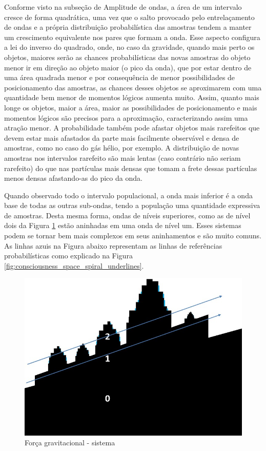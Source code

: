 Conforme visto na subseção de Amplitude de ondas, a área de um intervalo cresce de forma quadrática, uma vez que o salto provocado pelo entrelaçamento de ondas e a própria distribuição probabilística das amostras tendem a manter um crescimento equivalente nos pares que formam a onda. Esse aspecto configura a lei do inverso do quadrado, onde, no caso da gravidade, quando mais perto os objetos, maiores serão as chances probabilísticas das novas amostras do objeto menor ir em direção ao objeto maior (o pico da onda), que por estar dentro de uma área quadrada menor e por consequência de menor possibilidades de posicionamento das amostras, as chances desses objetos se aproximarem com uma quantidade bem menor de momentos lógicos aumenta muito. Assim, quanto mais longe os objetos, maior a área, maior as possibilidades de posicionamento e mais momentos lógicos são precisos para a aproximação, caracterizando assim uma atração menor. A probabilidade também pode afastar objetos mais rarefeitos que devem estar mais afastados da parte mais facilmente observável e densa de amostras, como no caso do gás hélio, por exemplo. A distribuição de novas amostras nos intervalos rarefeito são mais lentas (caso contrário não seriam rarefeito) do que nas partículas mais densas que tomam a frete dessas partículas menos densas afastando-as do pico da onda. 

Quando observado todo o intervalo populacional, a onda mais inferior é a onda base de todas as outras sub-ondas, tendo a população uma quantidade expressiva de amostras. Desta mesma forma, ondas de níveis superiores, como as de nível dois da Figura \ref{fig:consciousness_gravitational_force_system} estão aninhadas em uma onda de nível um. Esses sistemas podem se tornar bem mais complexos em seus aninhamentos e são muito comuns. As linhas azuis na Figura abaixo representam as linhas de referências probabilísticas como explicado na Figura \ref{fig:consciousness_space_spiral_underlines}.
	\begin{figure}[H]
	\caption{Força gravitacional - sistema}
	\label{fig:consciousness_gravitational_force_system}
	\centering
	\includegraphics[scale=.5]{sections/images/consciousness_gravitational_force_system.jpg}
	\end{figure}
	
